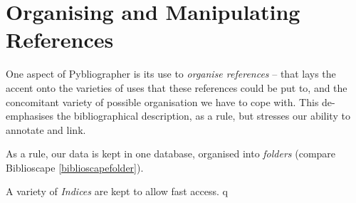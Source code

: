 \section{Organising and Manipulating References }
\label{sec:basicwork}

One aspect of Pybliographer is its use to \textit{organise references}
-- that lays the accent onto the varieties of uses that these
references could be put to, and the concomitant variety of possible
organisation we have to cope with. This de-emphasises the
bibliographical description, as a rule, but stresses our ability to
annotate and link.



As a rule, our data is kept in one database, organised into
\textit{folders} (compare Biblioscape \ref{biblioscapefolder}). 

A variety of \textit{Indices} are kept  to allow fast access. q


